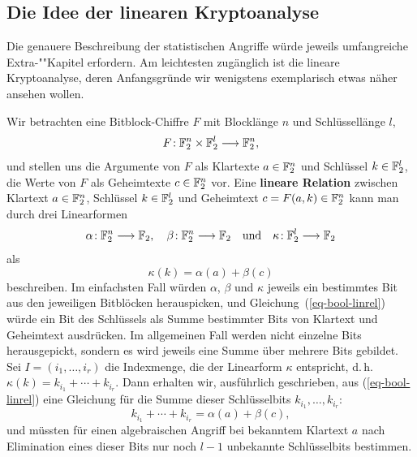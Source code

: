 \begin{refsegment}
\subsection{Die Idee der linearen Kryptoanalyse}\label{ss-bool-lka}

Die genauere Beschreibung der statistischen Angriffe würde jeweils
umfangreiche Extra-""Kapitel erfordern. Am leichtesten zugänglich
ist die lineare Kryptoanalyse,
deren Anfangsgründe wir wenigstens exemplarisch etwas näher ansehen wollen.

Wir betrachten eine Bitblock-Chiffre $F$
mit Blocklänge $n$ und Schlüssellänge $l$,
\[
   F\!: \mathbb{F}_2^n \times \mathbb{F}_2^l \longrightarrow \mathbb{F}_2^n,
\]
und stellen uns die Argumente von $F$ als Klartexte $a \in \mathbb{F}_2^n$
und Schlüssel $k \in \mathbb{F}_2^l$, die Werte von $F$ als Geheimtexte
$c \in \mathbb{F}_2^n$ vor. Eine
\textbf{lineare Relation}
zwischen Klartext
$a \in \mathbb{F}_2^n$, Schlüssel $k \in \mathbb{F}_2^l$ und Geheimtext
$c = F(a,k) \in \mathbb{F}_2^n$ kann man durch drei Linearformen
\[
   \alpha\!: \mathbb{F}_2^n \longrightarrow \mathbb{F}_2, \quad
   \beta\!: \mathbb{F}_2^n  \longrightarrow \mathbb{F}_2 \quad \text{und}
   \quad \kappa\!: \mathbb{F}_2^l \longrightarrow \mathbb{F}_2
\]
als
\begin{equation}\label{eq-bool-linrel}
   \kappa(k) = \alpha(a) + \beta(c)
\end{equation}
beschreiben. Im einfachsten Fall würden $\alpha$, $\beta$ und $\kappa$
jeweils ein bestimmtes Bit aus den jeweiligen Bitblöcken herauspicken, und
Gleichung~(\ref{eq-bool-linrel}) würde ein Bit des Schlüssels als Summe
bestimmter Bits von Klartext und Geheimtext ausdrücken. Im allgemeinen
Fall werden nicht einzelne Bits herausgepickt, sondern es wird jeweils
eine Summe über mehrere Bits gebildet. Sei $I = (i_1, \ldots, i_r)$ die
Indexmenge, die der Linearform $\kappa$ entspricht, d.\,h.
$\kappa(k) = k_{i_1} +  \cdots + k_{i_r}$. Dann erhalten wir,
ausführlich geschrieben, aus (\ref{eq-bool-linrel})
eine Gleichung für die Summe dieser Schlüsselbits $k_{i_1}, \ldots, k_{i_r}$:
\[
     k_{i_1} + \cdots + k_{i_r} = \alpha(a) + \beta(c),
\]
und müssten für einen algebraischen
Angriff bei
bekanntem Klartext
$a$ nach Elimination eines dieser
Bits nur noch $l-1$ unbekannte Schlüsselbits bestimmen.


\end{refsegment}
